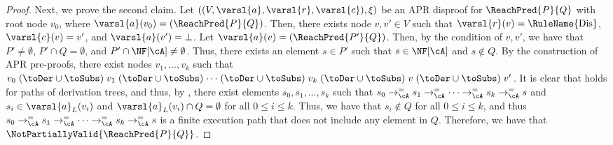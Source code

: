 \begin{proof}
	Next, we prove the second claim.
	Let $((V,\varsl{a},\varsl{r},\varsl{c}),\xi)$ be an APR disproof for $\ReachPred{P}{Q}$ with root node $v_0$,
	where $\varsl{a}(v_0) = (\ReachPred{P}{Q})$.
	Then, there exists node $v,v' \in V$ such that $\varsl{r}(v)=\mbox{\rm\RuleName{Dis}}$, $\varsl{c}(v)=v'$, and $\varsl{a}(v') = \bot$.
	Let $\varsl{a}(v) = (\ReachPred{P'}{Q})$.
	Then, by the condition of $v,v'$, we have that
	$P' \ne \emptyset$, $P' \cap Q = \emptyset$, and $P' \cap \NF[\cA] \ne \emptyset$.
	Thus, there exists an element $s \in P'$ such that $s \in \NF[\cA]$ and $s \notin Q$.
	By the construction of APR pre-proofs, there exist nodes $v_1,\ldots,v_k$ such that
	$v_0 \mathrel{(\toDer \cup \toSubs)}
		v_1 \mathrel{(\toDer \cup \toSubs)}
		\cdots \mathrel{(\toDer \cup \toSubs)}
		v_k \mathrel{(\toDer \cup \toSubs)}
		v \mathrel{(\toDer \cup \toSubs)}
		v'$.
	It is clear that  holds for paths of derivation trees, and thus, by , there exist elements $s_0,s_1,\ldots,s_k$ such that
	$s_0 \mathrel{\to_{\cA}^=}
		s_1 \mathrel{\to_{\cA}^=}
		\cdots \mathrel{\to_{\cA}^=}
		s_k
		\mathrel{\to_{\cA}^=}
		s$
	and
	$s_i \in \varsl{a}_L(v_i)$ and $\varsl{a}_L(v_i) \cap Q = \emptyset$ for all $0 \leq i \leq k$.
	Thus, we have that $s_i \notin Q$ for all $0 \leq i \leq k$, and thus
	$s_0 \mathrel{\to_{\cA}^=}
		s_1 \mathrel{\to_{\cA}^=}
		\cdots \mathrel{\to_{\cA}^=}
		s_k
		\mathrel{\to_{\cA}^=}
		s$
	is a finite execution path that does not include any element in $Q$.
	Therefore,
	we have that $\NotPartiallyValid{\ReachPred{P}{Q}}$.
\end{proof}


